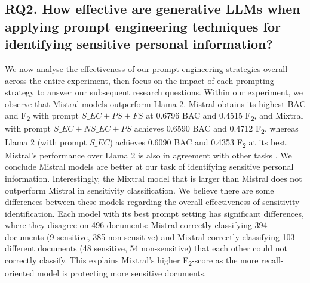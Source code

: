 \subsection{RQ2. How effective are generative LLMs when applying prompt engineering techniques for identifying sensitive personal information?}
We now analyse the effectiveness of our prompt engineering strategies overall across the entire experiment, then focus on the impact of each prompting strategy to answer our subsequent research questions. Within our experiment, we observe that Mistral models outperform Llama 2. Mistral obtains its highest BAC and F\textsubscript{2} with prompt $S\_EC+PS+FS$ at 0.6796 BAC and 0.4515 F\textsubscript{2}, and Mixtral with prompt $S\_EC+NS\_EC+PS$ achieves 0.6590 BAC and 0.4712 F\textsubscript{2}, whereas Llama 2 (with prompt $S\_EC$) achieves 0.6090 BAC and 0.4353 F\textsubscript{2} at its best. Mistral's performance over Llama 2 is also in agreement with other tasks \cite{jiang2023mistral}. We conclude Mistral models are better at our task of identifying sensitive personal information. Interestingly, the Mixtral model that is larger than Mistral does not outperform Mistral in sensitivity classification. We believe there are some differences between these models regarding the overall effectiveness of sensitivity identification. Each model with its best prompt setting has significant differences, where they disagree on 496 documents: Mistral correctly classifying 394 documents (9 sensitive, 385 non-sensitive) and Mixtral correctly classifying 103 different documents (48 sensitive, 54 non-sensitive) that each other could not correctly classify. This explains Mixtral's higher F\textsubscript{2}-score as the more recall-oriented model is protecting more sensitive documents. 


